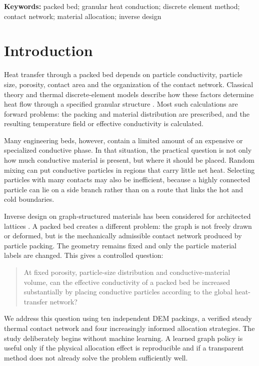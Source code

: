 \documentclass[12pt,a4paper]{article}
\begin{document}
	\noindent\textbf{Keywords:} packed bed; granular heat conduction; discrete
	element method; contact network; material allocation; inverse design
	
	\section{Introduction}
	
	Heat transfer through a packed bed depends on particle conductivity, particle
	size, porosity, contact area and the organization of the contact network.
	Classical theory and thermal discrete-element models describe how these factors
	determine heat flow through a specified granular structure
	\cite{Batchelor1977,Vargas2001,Kiani2019,Joulin2020}. Most such calculations are
	forward problems: the packing and material distribution are prescribed, and
	the resulting temperature field or effective conductivity is calculated.
	
	Many engineering beds, however, contain a limited amount of an expensive or
	specialized conductive phase. In that situation, the practical question is not
	only how much conductive material is present, but where it should be placed.
	Random mixing can put conductive particles in regions that carry little net
	heat. Selecting particles with many contacts may also be inefficient, because a
	highly connected particle can lie on a side branch rather than on a route that
	links the hot and cold boundaries.
	
	Inverse design on graph-structured materials has been considered for
	architected lattices \cite{Dold2023}. A packed bed creates a different problem:
	the graph is not freely drawn or deformed, but is the mechanically admissible
	contact network produced by particle packing. The geometry remains fixed and
	only the particle material labels are changed. This gives a controlled question:
	
	\begin{quote}
		At fixed porosity, particle-size distribution and conductive-material volume,
		can the effective conductivity of a packed bed be increased substantially by
		placing conductive particles according to the global heat-transfer network?
	\end{quote}
	
	We address this question using ten independent DEM packings, a verified steady
	thermal contact network and four increasingly informed allocation strategies.
	The study deliberately begins without machine learning. A learned graph policy
	is useful only if the physical allocation effect is reproducible and if a
	transparent method does not already solve the problem sufficiently well.
	
\end{document}
